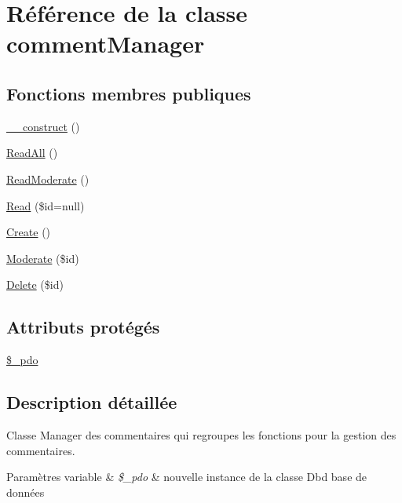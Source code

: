 \hypertarget{class_src_1_1_managers_1_1comment_manager}{}\section{Référence de la classe comment\+Manager}
\label{class_src_1_1_managers_1_1comment_manager}
\subsection*{Fonctions membres publiques}
\begin{DoxyCompactItemize}
\item 
\hyperlink{class_src_1_1_managers_1_1comment_manager_a095c5d389db211932136b53f25f39685}{\+\_\+\+\_\+construct} ()
\item 
\hyperlink{class_src_1_1_managers_1_1comment_manager_a24f9f6fa83eb8694eab0a87b2e6ad0b1}{Read\+All} ()
\item 
\hyperlink{class_src_1_1_managers_1_1comment_manager_a4224d6d3de965c48624a2c530d0a2c94}{Read\+Moderate} ()
\item 
\hyperlink{class_src_1_1_managers_1_1comment_manager_af0b2d518844625de0b1fe21ebb8e6c58}{Read} (\$id=null)
\item 
\hyperlink{class_src_1_1_managers_1_1comment_manager_ad01f71fa0ecc039494e3c282864298c3}{Create} ()
\item 
\hyperlink{class_src_1_1_managers_1_1comment_manager_a511df177d885f133ac59c2b68c7046f2}{Moderate} (\$id)
\item 
\hyperlink{class_src_1_1_managers_1_1comment_manager_a59113b5ecd1d155db6a4f30af34a1e80}{Delete} (\$id)
\end{DoxyCompactItemize}
\subsection*{Attributs protégés}
\begin{DoxyCompactItemize}
\item 
\hyperlink{class_src_1_1_managers_1_1comment_manager_a1e6d977917b70dce7e26cebad8438bf4}{\$\+\_\+pdo}
\end{DoxyCompactItemize}


\subsection{Description détaillée}
Classe Manager des commentaires qui regroupes les fonctions pour la gestion des commentaires. 
\begin{DoxyParams}[1]{Paramètres}
variable & {\em \$\+\_\+pdo} & nouvelle instance de la classe Dbd base de données \\
\hline
\end{DoxyParams}


